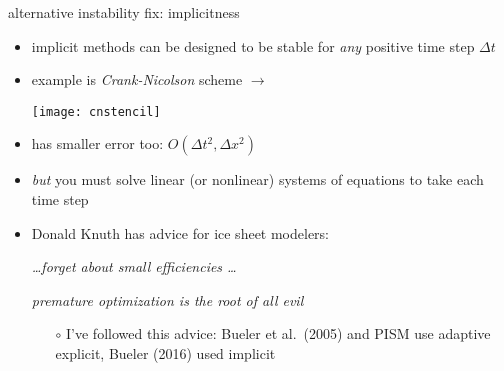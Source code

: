 \begin{frame}{alternative instability fix: implicitness}

\begin{itemize}
\item \alert{implicit} methods can be designed to be stable for \emph{any} positive time step $\Delta t$
\item example is \emph{Crank-Nicolson} scheme $\longrightarrow$

\vspace{-7mm}
\hfill \texttt{[image: cnstencil]}

\vspace{-5mm}
\item has smaller error too: $O(\Delta t^2,\Delta x^2)$
\item \emph{but} you must solve linear (or nonlinear) systems of equations to take each time step

\bigskip

\small
\item Donald Knuth has advice for ice sheet modelers:

\begin{center}
\emph{\dots forget about small efficiencies \dots}

\emph{premature optimization is the root of all evil}
\end{center}

    \begin{itemize}
    \item[$\circ$] I've followed this advice: Bueler et al.~(2005) and PISM use adaptive explicit, Bueler (2016) used implicit    
    \end{itemize}
\end{itemize}
\end{frame}


